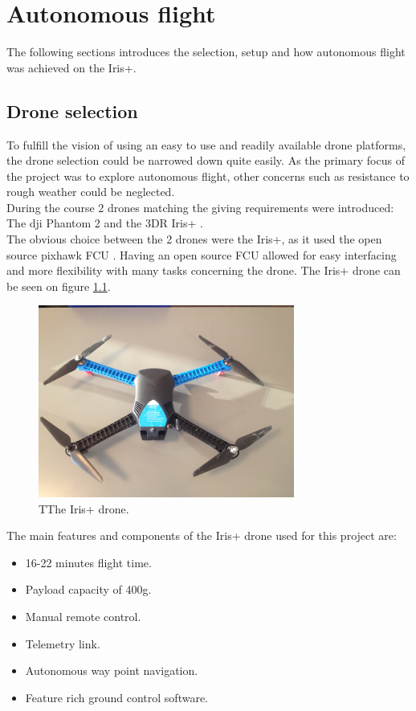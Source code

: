 \chapter{Autonomous flight}
The following sections introduces the selection, setup and how autonomous flight was achieved on
the Iris+.

\section{Drone selection}
To fulfill the vision of using an easy to use and readily available drone platforms,
the drone selection could be narrowed down quite easily. As the primary focus of the project was to
explore autonomous flight, other concerns such as resistance to rough weather could be neglected.
\\During the course 2 drones matching the giving requirements were introduced: The dji Phantom 2
\cite{Ref:dji} and the 3DR Iris+ \cite{Ref:3dr}.\\
The obvious choice between the 2 drones were the Iris+, as it used the open source pixhawk FCU
\cite{Ref:px4}. Having an open source FCU allowed for easy interfacing and more flexibility with
many tasks concerning the drone. The Iris+ drone can be seen on figure \ref{fig:iris}.\\

\begin{figure}[H]
  \centering
    \includegraphics[width=0.75\textwidth]{./Images/iris}
  \caption{TThe Iris+ drone.}
  \label{fig:iris}
\end{figure}

\newpage

The main features and components of the Iris+ drone used for this project are:
\begin{itemize}
\item 16-22 minutes flight time.
\item Payload capacity of 400g.
\item Manual remote control.
\item Telemetry link.
\item Autonomous way point navigation.
\item Feature rich ground control software.
\end{itemize}




